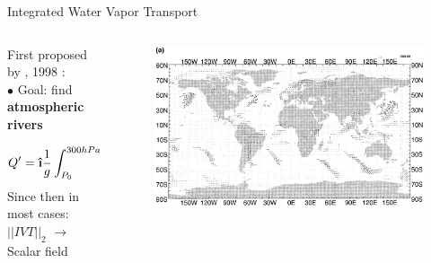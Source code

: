 \begin{frame}{Integrated Water Vapor Transport}

 \begin{columns}
   \begin{column}{0.55\textwidth}
First proposed by \citeauthor{zhu_proposed_1998}, 1998 \cite{zhu_proposed_1998}:\\
       $\bullet$ Goal: find \textbf{atmospheric rivers} 



    $$ 
    Q' = \ihat \frac{1}{g} \displaystyle\int_{P_0}^{300 hPa} \overline{q'u'} dp + \jhat \frac{1}{g} \displaystyle\int_{P_0}^{300 hPa} \overline{q'v'} dp
    $$
Since then in most cases: $||IVT||_2$ $\to$ Scalar field \cite{sousa_north_2020, jiang_impact_2017, ayantobo_integrated_2022, allan_diagnosing_2016, ralph_scale_2019, ralph_dropsonde_2017}
   \end{column}
   \begin{column}{0.45\textwidth}
    \begin{figure}[h]
      \centering
      \includegraphics[width=\columnwidth]{imglib/zhu_ars.png}
    \end{figure}
    
   \end{column}
  
 \end{columns} 
  
  
\end{frame}

